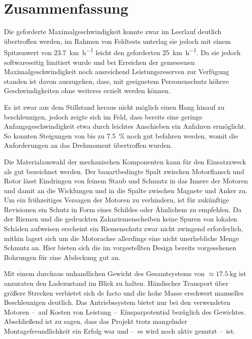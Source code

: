 \chapter{Zusammenfassung}
	Die geforderte Maximalgeschwindigkeit konnte zwar im Leerlauf deutlich übertroffen werden, im Rahmen von Feldtests unterlag sie jedoch mit einem Spitzenwert von \qty{23,7}{\kilo\metre\per\hour} leicht den geforderten \qty{25}{\kilo\metre\per\hour}.
	Da sie jedoch softwareseitig limitiert wurde und bei Erreichen der gemessenen Maximalgeschwindigkeit noch ausreichend Leistungsreserven zur Verfügung standen ist davon auszugehen, dass, mit geeignetem Personenschutz höhere Geschwindigkeiten ohne weiteres erzielt werden können.

	Es ist zwar aus dem Stillstand heraus nicht möglich einen Hang hinauf zu beschleunigen, jedoch zeigte sich im Feld, dass bereits eine geringe Anfangsgeschwindigkeit etwa durch leichtes Anschieben ein Anfahren ermöglicht.
	So konnten Steigungen von bis zu \qty{7,5}{\percent} noch gut befahren werden, womit die Anforderungen an das Drehmoment übertroffen wurden.\par\medskip
	Die Materialauswahl der mechanischen Komponenten kann für den Einsatzzweck als gut bezeichnet werden.
	Der bauartbedingte Spalt zwischen Motorflansch und Rotor lässt Eindringen von feinem Staub und Schmutz in das Innere der Motoren und damit an die Wicklungen und in die Spalte zwischen Magnete und Anker zu.
	Um ein frühzeitiges Versagen der Motoren zu verhindern, ist für zukünftige Revisionen ein Schutz in Form eines Schildes oder Ähnlichem zu empfehlen.
	Da der Riemen und die gedruckten Zahnriemenscheiben keine Spuren von lokalen Schäden aufweisen erscheint ein Riemenschutz zwar nicht zwingend erforderlich, mithin lagert sich um die Motorachse allerdings eine nicht unerhebliche Menge Schmutz an.
	Hier bieten sich die im vorgestellten Design bereits vorgesehenen Bohrungen für eine Abdeckung gut an.\par\medskip
	Mit einem durchaus unhandlichen Gewicht des Gesamtsystems von \(\approx \qty{17,5}{\kilo\gram}\) ist anzuraten den Ladezustand im Blick zu halten.
	Händischer Transport über größere Strecken verbietet sich de facto und die hohe Masse erschwert manuelles Beschleunigen deutlich.
	Das Antriebssystem bietet nur bei den verwendeten Motoren --~auf Kosten von Leistung --~Einsparpotential bezüglich des Gewichtes.
	Abschließend ist zu sagen, dass das Projekt trotz mangelnder Montagefreundlichkeit ein Erfolg war und --~es wird noch aktiv genutzt --~ist.